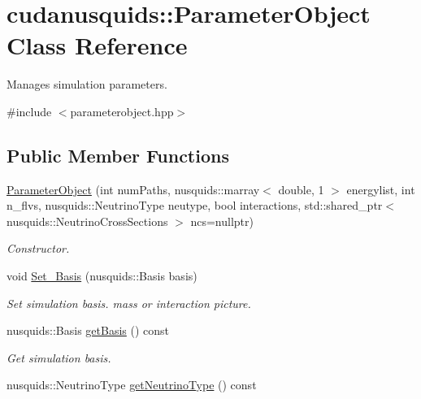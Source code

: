 \hypertarget{structcudanusquids_1_1ParameterObject}{}\section{cudanusquids\+:\+:Parameter\+Object Class Reference}
\label{structcudanusquids_1_1ParameterObject}


Manages simulation parameters.  




{\ttfamily \#include $<$parameterobject.\+hpp$>$}

\subsection*{Public Member Functions}
\begin{DoxyCompactItemize}
\item 
\hyperlink{structcudanusquids_1_1ParameterObject_ab827df940ce3b528848a2ea6d5da45a4}{Parameter\+Object} (int num\+Paths, nusquids\+::marray$<$ double, 1 $>$ energylist, int n\+\_\+flvs, nusquids\+::\+Neutrino\+Type neutype, bool interactions, std\+::shared\+\_\+ptr$<$ nusquids\+::\+Neutrino\+Cross\+Sections $>$ ncs=nullptr)
\begin{DoxyCompactList}\small\item\em Constructor. \end{DoxyCompactList}\item 
void \hyperlink{structcudanusquids_1_1ParameterObject_ad6d34eadcbe336d7d4a0cee88baad250}{Set\+\_\+\+Basis} (nusquids\+::\+Basis basis)\hypertarget{structcudanusquids_1_1ParameterObject_ad6d34eadcbe336d7d4a0cee88baad250}{}\label{structcudanusquids_1_1ParameterObject_ad6d34eadcbe336d7d4a0cee88baad250}

\begin{DoxyCompactList}\small\item\em Set simulation basis. mass or interaction picture. \end{DoxyCompactList}\item 
nusquids\+::\+Basis \hyperlink{structcudanusquids_1_1ParameterObject_a2ef518087ee701e0b84db97d4b675432}{get\+Basis} () const \hypertarget{structcudanusquids_1_1ParameterObject_a2ef518087ee701e0b84db97d4b675432}{}\label{structcudanusquids_1_1ParameterObject_a2ef518087ee701e0b84db97d4b675432}

\begin{DoxyCompactList}\small\item\em Get simulation basis. \end{DoxyCompactList}\item 
nusquids\+::\+Neutrino\+Type \hyperlink{structcudanusquids_1_1ParameterObject_a1e4a18e4e03a0e6ac7b2ddce3a46e3d2}{get\+Neutrino\+Type} () const \hypertarget{structcudanusquids_1_1ParameterObject_a1e4a18e4e03a0e6ac7b2ddce3a46e3d2}{}\label{structcudanusquids_1_1ParameterObject_a1e4a18e4e03a0e6ac7b2ddce3a46e3d2}


\end{DoxyCompactItemize}
